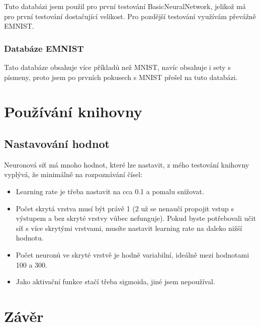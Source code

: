 \documentclass[12pt]{report}			%
\begin{document}
					Tuto databázi jsem použil pro první testování BasicNeuralNetwork, jelikož má pro první testování dostačující velikost. Pro pozdější testování využívám převážně EMNIST.
				\subsection{Databáze EMNIST}
					 \parencite[přeloženo]{article:EMNIST}
					
					Tato databáze obsahuje více příkladů než MNIST, navíc obsahuje i sety s písmeny, proto jsem po prvních pokusech s MNIST přešel na tuto databázi.

		\chapter{Používání knihovny}
			\section{Nastavování hodnot}
				Neuronová síť má mnoho hodnot, které lze nastavit, z mého testování knihovny vyplývá, že minimálně na rozpoznávání čísel:
				\begin{itemize}
					\item Learning rate je třeba nastavit na cca 0.1 a pomalu snižovat.
					\item Počet skrytá vrstva musí být právě 1 (2 už se nenaučí propojit vstup s výstupem a bez skryté vrstvy vůbec nefunguje). Pokud byste potřebovali učit síť s více skrytými vrstvami, musíte nastavit learning rate na daleko nižší hodnotu.
					\item Počet neuronů ve skryté vrstvě je hodně variabilní, ideálně mezi hodnotami 100 a 300.
					\item Jako aktivační funkce stačí třeba sigmoida, jiné jsem nepoužíval.
				\end{itemize}


	\appendix
	
	\chapter*{Závěr}
	
\end{document}

